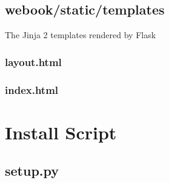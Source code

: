 \documentclass[]{report}   %
\begin{document}
\begin{appendices}
    \section{webook/static/templates}
    The Jinja 2 templates rendered by Flask
        \subsection{layout.html}
        

        \subsection{index.html}
        

\chapter{Install Script}
    \section{setup.py}



\end{appendices}

\printbibliography
\end{document}
